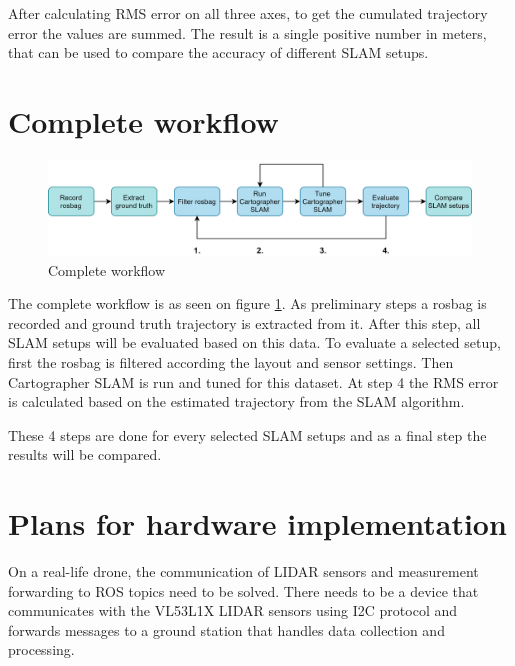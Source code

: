 After calculating RMS error on all three axes, to get the cumulated trajectory error the 
values are summed. The result is a single positive number in meters, that can be used to
compare the accuracy of different SLAM setups.


\section{Complete workflow}

\begin{figure}[!h]
    \centering
    \includegraphics[width=140mm, keepaspectratio]{figures/workflow.png}
    \caption{Complete workflow}
    \label{fig:workflow}
\end{figure}

The complete workflow is as seen on figure \ref{fig:workflow}. As preliminary steps a rosbag is
recorded and ground truth trajectory is extracted from it. After this step, all SLAM setups
will be evaluated based on this data. To evaluate a selected setup, first the rosbag is
filtered according the layout and sensor settings. Then Cartographer SLAM is run and 
tuned for this dataset. At step 4 the RMS error is calculated based on the estimated 
trajectory from the SLAM algorithm. 

These 4 steps are done for every selected SLAM setups and as a final step the results 
will be compared.


  
 





\newpage


\section{Plans for hardware implementation}
On a real-life drone, the communication of LIDAR sensors and measurement forwarding to ROS topics need
to be solved. There needs to be a device that communicates with the VL53L1X LIDAR sensors using I2C
protocol and forwards messages to a ground station that handles data collection and processing.

